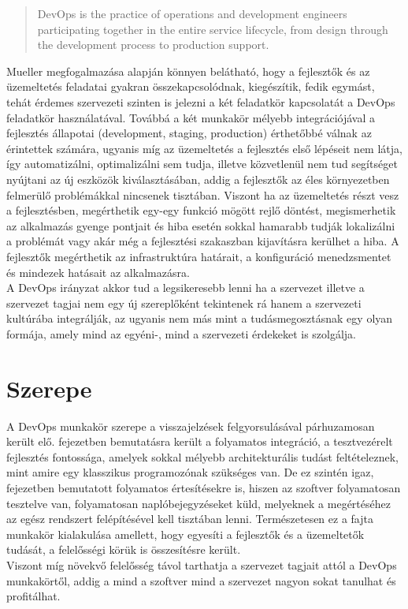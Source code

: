 \begin{quote}
DevOps is the practice of operations and development engineers participating together in the entire service lifecycle, from design through the development process to production support.
\end{quote}
\begin{flushright}
\citet*{agile_admin}
\end{flushright}

Mueller megfogalmazása alapján könnyen belátható, hogy a fejlesztők és az üzemeltetés feladatai gyakran összekapcsolódnak, kiegészítik, fedik egymást, tehát érdemes szervezeti szinten is jelezni a két feladatkör kapcsolatát a DevOps feladatkör használatával.
Továbbá a két munkakör mélyebb integrációjával a fejlesztés állapotai (development, staging, production) érthetőbbé válnak az érintettek számára, ugyanis míg az üzemeltetés a fejlesztés első lépéseit nem látja, így automatizálni, optimalizálni sem tudja, illetve közvetlenül nem tud segítséget nyújtani az új eszközök kiválasztásában, addig a fejlesztők az éles környezetben felmerülő problémákkal nincsenek tisztában. Viszont ha az üzemeltetés részt vesz a fejlesztésben, megérthetik egy-egy funkció mögött rejlő döntést, megismerhetik az alkalmazás gyenge pontjait és hiba esetén sokkal hamarabb tudják lokalizálni a problémát vagy akár még a fejlesztési szakaszban kijavításra kerülhet a hiba. A fejlesztők megérthetik az infrastruktúra határait, a konfiguráció menedzsmentet és mindezek hatásait az alkalmazásra.\\
A DevOps irányzat akkor tud a legsikeresebb lenni ha a szervezet illetve a szervezet tagjai nem egy új szereplőként tekintenek rá hanem a szervezeti kultúrába integrálják, az ugyanis nem más mint a tudásmegosztásnak egy olyan formája, amely mind az egyéni-, mind a szervezeti érdekeket is szolgálja.

\section{Szerepe}

A DevOps munkakör szerepe a visszajelzések felgyorsulásával párhuzamosan került elő.  fejezetben bemutatásra került a folyamatos integráció, a tesztvezérelt fejlesztés fontossága, amelyek sokkal mélyebb architekturális tudást feltételeznek, mint amire egy klasszikus programozónak szükséges van. De ez szintén igaz,  fejezetben bemutatott folyamatos értesítésekre is, hiszen az szoftver folyamatosan tesztelve van, folyamatosan naplóbejegyzéseket küld, melyeknek a megértéséhez az egész rendszert felépítésével kell tisztában lenni. Természetesen ez a fajta munkakör kialakulása amellett, hogy egyesíti a fejlesztők és a üzemeltetők tudását, a felelősségi körük is összesítésre került.\\
Viszont míg növekvő felelősség távol tarthatja a szervezet tagjait attól a DevOps munkakörtől, addig a mind a szoftver mind a szervezet nagyon sokat tanulhat és profitálhat.

